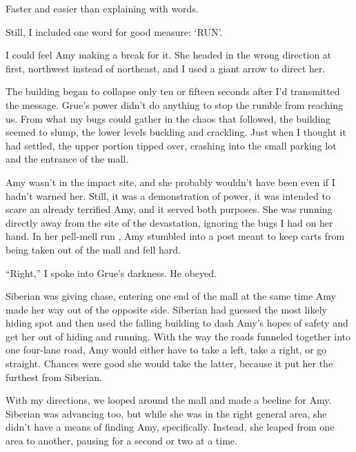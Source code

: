 Faster and easier than explaining with words.



Still, I included one word for good measure:  `RUN'.



I could feel Amy making a break for it.  She headed in the wrong direction at first, northwest instead of northeast, and I used a giant arrow to direct her.



The building began to collapse only ten or fifteen seconds after I'd transmitted the message.  Grue's power didn't do anything to stop the rumble from reaching us.  From what my bugs could gather in the chaos that followed, the building seemed to slump, the lower levels buckling and crackling.  Just when I thought it had settled, the upper portion tipped over, crashing into the small parking lot and the entrance of the mall.



Amy wasn't in the impact site, and she probably wouldn't have been even if I hadn't warned her.  Still, it was a demonstration of power, it was intended to scare an already terrified Amy, and it served both purposes.  She was running directly away from the site of the devastation, ignoring the bugs I had on her hand.  In her pell-mell run , Amy stumbled into a post meant to keep carts from being taken out of the mall and fell hard.



``Right,'' I spoke into Grue's darkness.  He obeyed.



Siberian was giving chase, entering one end of the mall at the same time Amy made her way out of the opposite side.  Siberian had guessed the most likely hiding spot and then used the falling building to dash Amy's hopes of safety and get her out of hiding and running.  With the way the roads funneled together into one four-lane road, Amy would either have to take a left, take a right, or go straight.  Chances were good she would take the latter, because it put her the furthest from Siberian.



With my directions, we looped around the mall and made a beeline for Amy.  Siberian was advancing too, but while she was in the right general area, she didn't have a means of finding Amy, specifically.  Instead, she leaped from one area to another, pausing for a second or two at a time.



